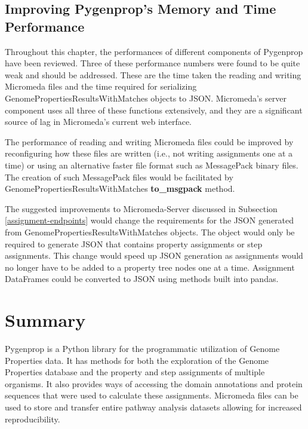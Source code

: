 \subsection{Improving Pygenprop's Memory and Time Performance} \label{improving-pygenprop-performance}

Throughout this chapter, the performances of different components of Pygenprop have been reviewed. Three of these performance numbers were found to be quite weak and should be addressed. These are the time taken the reading and writing Micromeda files and the time required for serializing GenomePropertiesResultsWithMatches objects to JSON. Micromeda's server component uses all three of these functions extensively, and they are a significant source of lag in Micromeda's current web interface.

The performance of reading and writing Micromeda files could be improved by reconfiguring how these files are written (i.e., not writing assignments one at a time) or using an alternative faster file format such as MessagePack binary files. The creation of such MessagePack files would be facilitated by GenomePropertiesResultsWithMatches \textbf{to\_msgpack} method. 
 
The suggested improvements to Micromeda-Server discussed in Subsection \ref{assignment-endpoints} would change the requirements for the JSON generated from GenomePropertiesResultsWithMatches objects. The object would only be required to generate JSON that contains property assignments or step assignments. This change would speed up JSON generation as assignments would no longer have to be added to a property tree nodes one at a time. Assignment DataFrames could be converted to JSON using methods built into pandas.

\section{Summary}

Pygenprop is a Python library for the programmatic utilization of Genome Properties data. It has methods for both the exploration of the Genome Properties database and the property and step assignments of multiple organisms. It also provides ways of accessing the domain annotations and protein sequences that were used to calculate these assignments. Micromeda files can be used to store and transfer entire pathway analysis datasets allowing for increased reproducibility.

